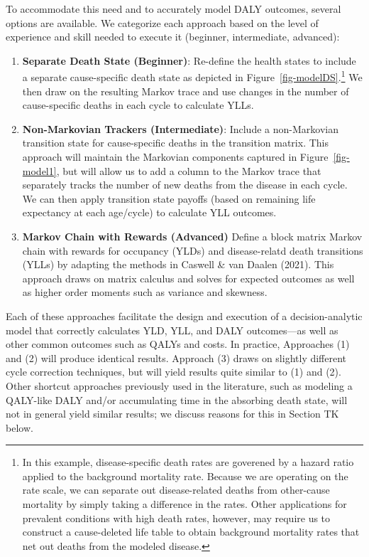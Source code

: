 \documentclass[
]{agujournal2019}
\begin{document}
To accommodate this need and to accurately model DALY outcomes, several
options are available. We categorize each approach based on the level of
experience and skill needed to execute it (beginner, intermediate,
advanced):

\begin{enumerate}
\def\labelenumi{\arabic{enumi}.}
\item
  \textbf{Separate Death State (Beginner)}: Re-define the health states
  to include a separate cause-specific death state as depicted in
  Figure~\ref{fig-modelDS}.\footnote{In this example, disease-specific
    death rates are goverened by a hazard ratio applied to the
    background mortality rate. Because we are operating on the rate
    scale, we can separate out disease-related deaths from other-cause
    mortality by simply taking a difference in the rates. Other
    applications for prevalent conditions with high death rates,
    however, may require us to construct a cause-deleted life table to
    obtain background mortality rates that net out deaths from the
    modeled disease.} We then draw on the resulting Markov trace and use
  changes in the number of cause-specific deaths in each cycle to
  calculate YLLs.
\item
  \textbf{Non-Markovian Trackers (Intermediate)}: Include a
  non-Markovian transition state for cause-specific deaths in the
  transition matrix. This approach will maintain the Markovian
  components captured in Figure~\ref{fig-model1}, but will allow us to
  add a column to the Markov trace that separately tracks the number of
  new deaths from the disease in each cycle. We can then apply
  transition state payoffs (based on remaining life expectancy at each
  age/cycle) to calculate YLL outcomes.
\item
  \textbf{Markov Chain with Rewards (Advanced)} Define a block matrix
  Markov chain with rewards for occupancy (YLDs) and disease-relatd
  death transitions (YLLs) by adapting the methods in Caswell \& van
  Daalen (2021). This approach draws on matrix calculus and solves for
  expected outcomes as well as higher order moments such as variance and
  skewness.
\end{enumerate}

Each of these approaches facilitate the design and execution of a
decision-analytic model that correctly calculates YLD, YLL, and DALY
outcomes---as well as other common outcomes such as QALYs and costs. In
practice, Approaches (1) and (2) will produce identical results.
Approach (3) draws on slightly different cycle correction techniques,
but will yield results quite similar to (1) and (2). Other shortcut
approaches previously used in the literature, such as modeling a
QALY-like DALY and/or accumulating time in the absorbing death state,
will not in general yield similar results; we discuss reasons for this
in Section TK below.
\end{document}
